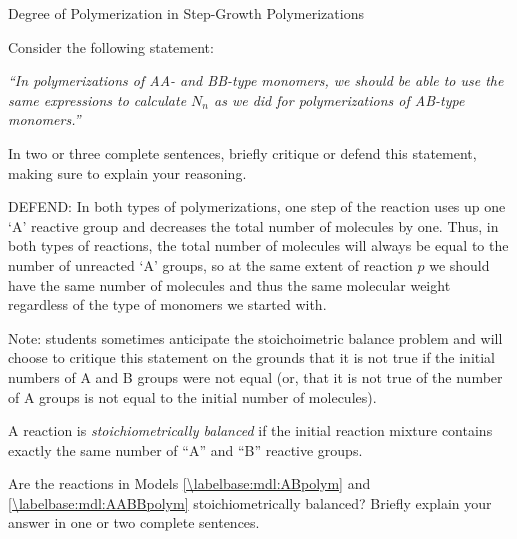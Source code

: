 \begin{activity}{Degree of Polymerization in Step-Growth Polymerizations}
\begin{ctqs}
		\question Consider the following statement:
		
			\emph{``In polymerizations of AA- and BB-type monomers, we should be able to use the same expressions to calculate $N_n$ as we did for polymerizations of AB-type monomers.''}
			
			In two or three complete sentences, briefly critique or defend this statement, making sure to explain your reasoning.
		
			\begin{solution}[1.5in]
				DEFEND: In both types of polymerizations, one step of the reaction uses up one `A' reactive group and decreases the total number of molecules by one. Thus, in both types of reactions, the total number of molecules will always be equal to the number of unreacted `A' groups, so at the same extent of reaction $p$ we should have the same number of molecules and thus the same molecular weight regardless of the type of monomers we started with.
				
				Note: students sometimes anticipate the stoichoimetric balance problem and will choose to critique this statement on the grounds that it is not true if the initial numbers of A and B groups were not equal (or, that it is not true of the number of A groups is not equal to the initial number of molecules). 
			\end{solution}
			
\end{ctqs}
	
\begin{infobox}

A reaction is \emph{stoichiometrically balanced} if the initial reaction mixture contains exactly the same number of ``A'' and ``B'' reactive groups.

\end{infobox}
	
\begin{ctqs}
		\question Are the reactions in Models \ref{\labelbase:mdl:ABpolym} and \ref{\labelbase:mdl:AABBpolym} stoichiometrically balanced?  Briefly explain your answer in one or two complete sentences.
		
		\begin{solution}[1in]\end{solution}
		

\end{ctqs}
\end{activity}
